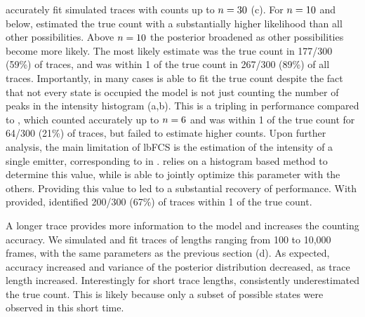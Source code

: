 \ours accurately fit simulated traces with counts up to $n=30$ (c).
	For $n=10$ and below, \ours estimated the true count with a substantially 
	higher likelihood than all other possibilities. 
	Above $n=10$ the posterior broadened as other possibilities become more likely. 
	The most likely estimate was the true count in 177/300 (59\%) of traces, and 
	was within 1 of the true count in 267/300 (89\%) of all traces.
	Importantly, in many cases \ours is able to fit the true count despite the fact that 
	not every state is occupied \ie the model is not just counting the 
	number of peaks in the intensity histogram (a,b).
	This is a tripling in performance compared to \lbfcs, which counted 
	accurately up to $n=6$ and was within 1 of the true count for 64/300 (21\%) of traces, 
	but failed to estimate higher counts.
	Upon further analysis, the main limitation of lbFCS is the estimation of the 
	intensity of a single emitter, corresponding to \re in \ours. 
	\lbfcs relies on a histogram based method to determine this value, while 
	\ours is able to jointly optimize this parameter with the others.
	Providing this value to \lbfcs led to a substantial recovery of performance.
	With \re provided, \lbfcs identified 200/300 (67\%) of traces within 1 of the true count.

A longer trace provides more
information to the model and increases the counting accuracy.
	We simulated and fit traces of lengths ranging from 100 to 10,000 frames, with the same parameters 
	as the previous section (d).
	As expected, accuracy increased and variance of the posterior distribution decreased, 
	as trace length increased.
	Interestingly for short trace lengths, \ours consistently underestimated the true count. 
	This is likely because only a subset of possible states were observed in this short time. %

